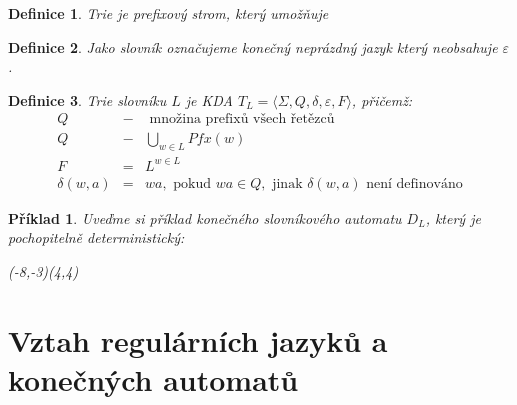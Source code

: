\documentclass[10pt, a4paper, titlepage]{article}
\theoremstyle{note}
\newtheorem{definice}{Definice}
\newtheorem{priklad}{Příklad}
\begin{document}
\begin{definice}
\emph{Trie} je prefixový strom, který umožňuje 
\end{definice}

\begin{definice}
Jako \emph{slovník} označujeme konečný neprázdný jazyk který neobsahuje $\varepsilon$.
\end{definice}

\begin{definice}
Trie slovníku $L$ je KDA $T_{L} = \langle \Sigma, Q, \delta, \varepsilon, F \rangle$, přičemž:
\begin{eqnarray*}
Q &-& \text{ množina prefixů všech řetězců} \\
Q &-& \bigcup_{w \in L} Pfx(w) \\
F &=& L^{w \in L} \\
\delta(w,a) &=& wa, \text{ pokud } wa \in Q, \text{ jinak } \delta(w,a) \text{ není definováno}
\end{eqnarray*}
\end{definice}

\begin{priklad}
Uveďme si příklad konečného slovníkového automatu $D_{L}$, který je pochopitelně deterministický:



\begin{VCPicture}{(-8,-3)(4,4)}
\LargeState
{}



\end{VCPicture}

\end{priklad}


\section{Vztah regulárních jazyků a konečných automatů}
\end{document}
